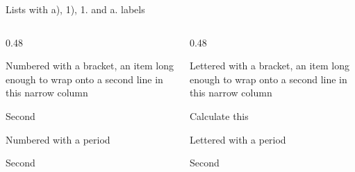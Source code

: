 \begin{standardframe}{Lists with a), 1), 1. and a. labels}
	\begin{columns}[T,onlytextwidth]
		\begin{column}{0.48\linewidth}
			\begin{SMNumItemize}
				\item Numbered with a bracket, an item long enough to wrap onto a second line in this narrow column
				\item Second
			\end{SMNumItemize}
			\begin{SMNumPeriodItemize}
				\item Numbered with a period
				\item Second
			\end{SMNumPeriodItemize}
		\end{column}
		\begin{column}{0.48\linewidth}
			\begin{SMAlphaItemize}
				\item Lettered with a bracket, an item long enough to wrap onto a second line in this narrow column
				\item Calculate this
			\end{SMAlphaItemize}
			\begin{SMAlphaPeriodItemize}
				\item Lettered with a period
				\item Second
			\end{SMAlphaPeriodItemize}
		\end{column}
	\end{columns}
\end{standardframe}

